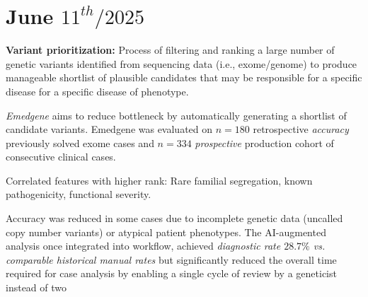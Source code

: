 \documentclass[../main.tex]{subfiles}
\begin{document}
\chapter{June $11^{th} / 2025$}
\label{ch:tufte-design}

 \cite{Meng2023}

\hrulefill

\textbf{Variant prioritization:} Process of filtering and ranking a large number of genetic 
variants identified from sequencing data (i.e., exome/genome) to produce manageable shortlist of plausible candidates that may be responsible for a specific disease for a specific disease of phenotype.

\textit{Emedgene} aims to reduce bottleneck by automatically generating a shortlist of candidate variants.
Emedgene was evaluated on $n=180$ retrospective \textit{accuracy} previously solved exome cases and $n=334$ \textit{prospective} production cohort of consecutive clinical cases.

Correlated features with higher rank: Rare familial segregation, known pathogenicity, functional severity.

Accuracy was reduced in some cases due to incomplete genetic data (uncalled copy number variants) or atypical patient phenotypes. The AI-augmented analysis once integrated into workflow, achieved \textit{diagnostic rate $28.7\%$ vs. comparable historical manual rates} but significantly reduced the overall time required for case analysis by enabling a single cycle of review by a geneticist instead of two
\end{document}
